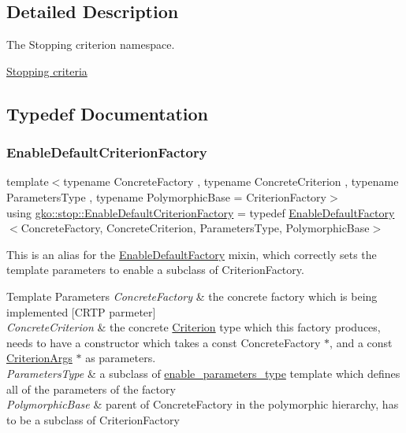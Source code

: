 \subsection{Detailed Description}
The Stopping criterion namespace. 

\hyperlink{group__stop}{Stopping criteria} 

\subsection{Typedef Documentation}
\mbox{\label{namespacegko_1_1stop_ab045b6fd7571f3234d9a63a5ee5a2252}} 
\subsubsection{\texorpdfstring{Enable\+Default\+Criterion\+Factory}{EnableDefaultCriterionFactory}}
{\footnotesize\ttfamily template$<$typename Concrete\+Factory , typename Concrete\+Criterion , typename Parameters\+Type , typename Polymorphic\+Base  = Criterion\+Factory$>$ \\
using \hyperlink{namespacegko_1_1stop_ab045b6fd7571f3234d9a63a5ee5a2252}{gko\+::stop\+::\+Enable\+Default\+Criterion\+Factory} = typedef \hyperlink{classgko_1_1EnableDefaultFactory}{Enable\+Default\+Factory}$<$Concrete\+Factory, Concrete\+Criterion, Parameters\+Type, Polymorphic\+Base$>$}



This is an alias for the \hyperlink{classgko_1_1EnableDefaultFactory}{Enable\+Default\+Factory} mixin, which correctly sets the template parameters to enable a subclass of Criterion\+Factory. 


\begin{DoxyTemplParams}{Template Parameters}
{\em Concrete\+Factory} & the concrete factory which is being implemented \mbox{[}C\+R\+TP parmeter\mbox{]} \\
\hline
{\em Concrete\+Criterion} & the concrete \hyperlink{classgko_1_1stop_1_1Criterion}{Criterion} type which this factory produces, needs to have a constructor which takes a const Concrete\+Factory $\ast$, and a const \hyperlink{structgko_1_1stop_1_1CriterionArgs}{Criterion\+Args} $\ast$ as parameters. \\
\hline
{\em Parameters\+Type} & a subclass of \hyperlink{structgko_1_1enable__parameters__type}{enable\+\_\+parameters\+\_\+type} template which defines all of the parameters of the factory \\
\hline
{\em Polymorphic\+Base} & parent of Concrete\+Factory in the polymorphic hierarchy, has to be a subclass of Criterion\+Factory \\
\hline
\end{DoxyTemplParams}
